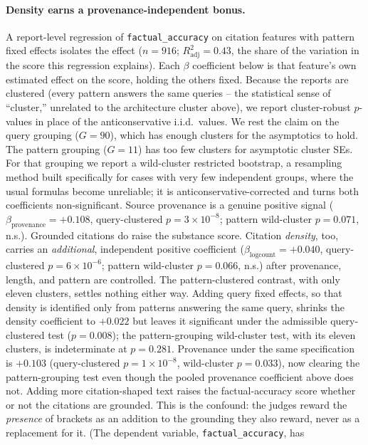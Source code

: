 \documentclass[11pt]{article}
\newcommand{\dimrow}[1]{\texttt{#1}}
\begin{document}
\paragraph{Density earns a provenance-independent bonus.} A report-level regression of
\dimrow{factual\_accuracy} on citation features with pattern fixed effects isolates the
effect ($n{=}916$; $R^2_{\text{adj}}{=}0.43$, the share of the variation in the score this
regression explains). Each $\beta$ coefficient below is that feature's own estimated effect
on the score, holding the others fixed. Because the reports are clustered
(every pattern answers the same queries -- the statistical sense of ``cluster,'' unrelated to
the architecture cluster above), we report cluster-robust $p$-values in place of the
anticonservative i.i.d.\ values. We rest the claim on the query grouping ($G{=}90$), which has
enough clusters for the asymptotics to hold. The pattern grouping ($G{=}11$) has too few clusters
for asymptotic cluster SEs. For that grouping we report a wild-cluster restricted
bootstrap, a resampling method built specifically for cases with very few independent groups,
where the usual formulas become unreliable; it is anticonservative-corrected and turns both
coefficients non-significant.
Source provenance is a genuine
positive signal ($\beta_{\text{provenance}}=+0.108$, query-clustered $p=3{\times}10^{-8}$;
pattern wild-cluster $p=0.071$, n.s.). Grounded citations
do raise the substance score. Citation \emph{density}, too, carries an
\emph{additional}, independent positive coefficient
($\beta_{\log\text{count}}=+0.040$, query-clustered $p=6{\times}10^{-6}$; pattern wild-cluster
$p=0.066$, n.s.) after provenance, length, and pattern
are controlled. The
pattern-clustered contrast, with only eleven clusters, settles nothing either way. Adding query fixed
effects, so that density is identified only from patterns
answering the same query, shrinks the density coefficient to $+0.022$ but leaves it
significant under the admissible query-clustered test ($p{=}0.008$); the pattern-grouping
wild-cluster test, with its eleven clusters, is indeterminate at $p{=}0.281$. Provenance under
the same specification is $+0.103$ (query-clustered $p{=}1{\times}10^{-8}$, wild-cluster
$p{=}0.033$), now clearing the pattern-grouping test even though the pooled provenance
coefficient above does not. Adding more citation-shaped text raises the
factual-accuracy score whether or not the citations are grounded. This is the confound:
the judges reward the \emph{presence} of brackets as an addition to the grounding they also
reward, never as a replacement for it. (The dependent variable, \dimrow{factual\_accuracy}, has
\end{document}
